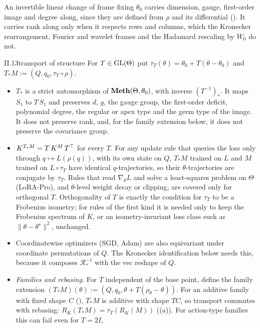 An invertible linear change of frame fixing $\theta_0$ carries dimension, gauge, first-order image and degree along,
since they are defined from $\rho$ and its differential (). It carries rank along only when it respects rows
and columns, which the Kronecker rearrangement, Fourier and wavelet frames and the Hadamard rescaling by $W_0$ do not.

\begin{proposition}{II.13}{transport of structure}
For $T\in\mathrm{GL}(\Theta)$ put $\tau_T(\theta)=\theta_0+T(\theta-\theta_0)$ and $T_*M:=(Q,q_0,\tau_T\circ\rho)$.
\begin{itemize}
  \item $T_*$ is a strict automorphism of $\mathbf{Meth}(\Theta,\theta_0)$, with inverse $(T^{-1})_*$. It maps $S_1$ to $T\,S_1$
    and preserves $d$, $g$, the gauge group, the first-order deficit, polynomial degree, the regular or apex type and
    the germ type of the image. It does not preserve rank, and, for the family extension below, it does not preserve the
    covariance group.
  \item $K^{T_*M}=T\,K^M\,T^{\top}$ for every $T$. For any update rule that queries the loss only through
    $q\mapsto L(\rho(q))$, with its own state on $Q$, $T_*M$ trained on $L$ and $M$ trained on $L\circ\tau_T$ have
    identical $q$-trajectories, so their $\theta$-trajectories are conjugate by $\tau_T$. Rules that read
    $\nabla_\theta L$ and solve a least-squares problem on $\Theta$ (LoRA-Pro), and $\theta$-level weight decay or
    clipping, are covered only for orthogonal $T$. Orthogonality of $T$ is exactly the condition for $\tau_T$ to be a
    Frobenius isometry; for rules of the first kind it is needed only to keep the Frobenius spectrum of $K$, or an
    isometry-invariant loss class such as $\lVert\theta-\theta^\star\rVert^2$, unchanged.
  \item Coordinatewise optimizers (SGD, Adam) are also equivariant under coordinate permutations of $Q$. The Kronecker
    identification below needs this, because it composes $\mathcal R^{-1}_*$ with the vec reshape of $Q$.
  \item \emph{Families and rebasing.} For $T$ independent of the base point, define the family extension
    $(T_*M)(\theta):=(Q,q_0,\theta+T(\rho_\theta-\theta))$. For an additive family with fixed shape $C$
    (), $T_*M$ is additive with shape $TC$, so transport commutes with rebasing:
    $R_K(T_*M)=\tau_T(R_K(M))$ ((a)). For action-type families this can fail even for $T=2I$,

\end{itemize}
\end{proposition}

